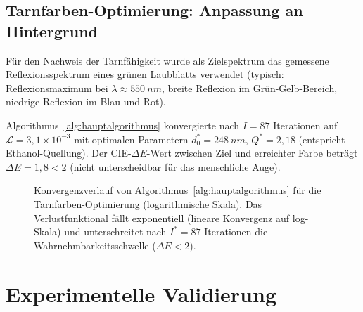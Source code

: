 ﻿\documentclass[a4paper,12pt]{article}
\theoremstyle{definition}
\begin{document}
	\subsection{Tarnfarben-Optimierung: Anpassung an Hintergrund}
	
	Für den Nachweis der Tarnfähigkeit wurde als Zielspektrum das gemessene
	Reflexionsspektrum eines grünen Laubblatts verwendet
	(typisch: Reflexionsmaximum bei $\lambda \approx \SI{550}{nm}$,
	breite Reflexion im Grün-Gelb-Bereich, niedrige Reflexion im Blau und Rot).
	
	Algorithmus~\ref{alg:hauptalgorithmus} konvergierte nach $I = 87$ Iterationen
	auf $\mathcal{L} = 3{,}1 \times 10^{-3}$ mit optimalen Parametern
	$d_0^* = \SI{248}{nm}$, $Q^* = 2{,}18$ (entspricht Ethanol-Quellung).
	Der CIE-$\Delta E$-Wert zwischen Ziel und erreichter Farbe beträgt $\Delta E = 1{,}8 < 2$
	(nicht unterscheidbar für das menschliche Auge).
	
	\begin{figure}[htb]
		\centering
		\caption{Konvergenzverlauf von Algorithmus~\ref{alg:hauptalgorithmus}
			für die Tarnfarben-Optimierung (logarithmische Skala). Das Verlustfunktional
			fällt exponentiell (lineare Konvergenz auf log-Skala) und unterschreitet
			nach $I^* = 87$ Iterationen die Wahrnehmbarkeitsschwelle ($\Delta E < 2$).}
		\label{fig:konvergenz}
	\end{figure}
	
	\section{Experimentelle Validierung}
	\label{sec:validierung}
	
\end{document}
